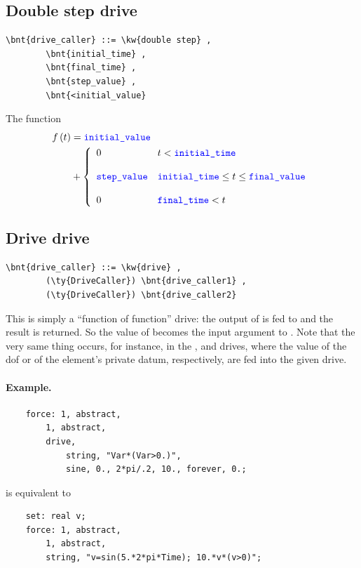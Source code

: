 \subsection{Double step drive}
\begin{Verbatim}[commandchars=\\\{\}]
    \bnt{drive_caller} ::= \kw{double step} ,
        \bnt{initial_time} , 
        \bnt{final_time} ,
        \bnt{step_value} , 
        \bnt{<initial_value}
\end{Verbatim}
The function
\begin{align}
	f\plbr{t} &= \nt{initial\_value} \nonumber \\
	&+ \lcubr{\matr{ll}{
		0
			& t < \nt{initial\_time} \\
		\\
		\nt{step\_value}
			& \nt{initial\_time} \le t \le \nt{final\_value} \\
		\\
		0 
			& \nt{final\_time} < t
	}}
\end{align}

\subsection{Drive drive}
\begin{Verbatim}[commandchars=\\\{\}]
    \bnt{drive_caller} ::= \kw{drive} ,
        (\ty{DriveCaller}) \bnt{drive_caller1} , 
        (\ty{DriveCaller}) \bnt{drive_caller2}
\end{Verbatim}
This is simply a ``function of function'' drive: the output 
of  is fed to 
and the result is returned.
So the value of  becomes the input argument
to .
Note that the very same thing occurs, for instance, in the
,  and  drives, where the value of the dof
or of the element's private datum, respectively, are fed 
into the given drive.

\paragraph{Example.}
\begin{verbatim}
    force: 1, abstract,
        1, abstract,
        drive,
            string, "Var*(Var>0.)",
            sine, 0., 2*pi/.2, 10., forever, 0.;
\end{verbatim}
is equivalent to
\begin{verbatim}
    set: real v;
    force: 1, abstract,
        1, abstract,
        string, "v=sin(5.*2*pi*Time); 10.*v*(v>0)";
\end{verbatim}

